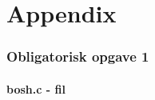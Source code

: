 \documentclass[main.tex]{subfile}
\begin{document}
\part{Appendix}
\section{Obligatorisk opgave 1}
\subsection{bosh.c - fil}
\begin{minipage}{\textwidth}

\end{minipage}
\end{document}
